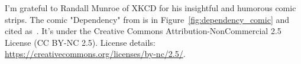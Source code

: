 
I'm grateful to Randall Munroe of XKCD for his insightful and humorous comic strips. The comic "Dependency" from  is in Figure~\ref{fig:dependency_comic} and cited as~\cite{munroeDependency2020}. It's under the Creative Commons Attribution-NonCommercial 2.5 License (CC BY-NC 2.5). License details: \url{https://creativecommons.org/licenses/by-nc/2.5/}.

